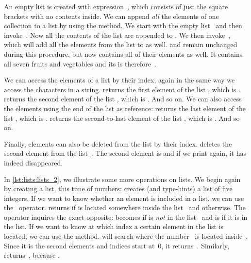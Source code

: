 An empty list is created with expression~\pythonilIdx{[]}, which consists of just the square brackets with no contents inside.
We can append \emph{all} the elements of one collection to a list by using the  method.
We start with the empty list~ and then invoke~.
Now all the contents of the list  are appended to .
We then invoke~, which will add all the elements from the list  to  as well.
 and  remain unchanged during this procedure, but  now contains all of their elements as well.
It contains all seven fruits and vegetables and its  is therefore~.

We can access the elements of a list by their index, again in the same way we access the characters in a string.
 returns the first element of the list , which is .
 returns the second element of the list , which is .
And so on.
We can also access the elements using the end of the list as reference:
 returns the last element of the list , which is .
 returns the second-to-last element of the list , which is .
And so on.

Finally, elements can also be deleted from the list by their index.
 deletes the second element from the list~.
The second element is  and if we print  again, it has indeed disappeared.

In \cref{lst:lists:lists_2}, we illustrate some more operations on lists.
We begin again by creating a list, this time of numbers:  creates (and type-hints) a list of five integers.
If we want to know whether an element is included in a list, we can use the ~operator.
 returns  if  is located somewhere inside the list~ and  otherwise.
The  operator inquires the exact opposite:
 becomes  if  is \emph{not} in the list~ and is  if it is in the list.
If we want to know at which index a certain element in the list is located, we can use the  method.
 will search where the number~ is located inside~.
Since it is the second elements and indices start at~0, it returns~.
Similarly,  returns~, because .

